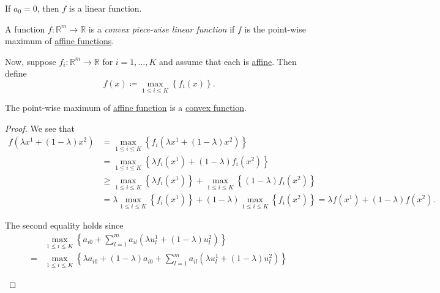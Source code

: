 \begin{remark}
	If \(a_0 = 0\), then \(f\) is a linear function.
\end{remark}

\begin{definition}\label{def:convex-piece-wise-linear-function}
	A function \(f\colon \mathbb{R}^{m}\to \mathbb{R}\) is a \emph{convex piece-wise linear function} if
	\(f\) is the point-wise maximum of \hyperref[def:affine-function]{affine functions}.
	\begin{center}
	\end{center}
\end{definition}

Now, suppose \(f_{i}\colon \mathbb{R}^m \to \mathbb{R}\) for \(i = 1, \ldots , K\) and assume that each is \hyperref[def:affine-function]{affine}.
Then define
\[
	f(x)\coloneqq \max_{1\leq i\leq K} \left\{ f_i(x) \right\}.
\]

\begin{theorem}
	The point-wise maximum of \hyperref[def:affine-function]{affine function} is a \hyperref[def:convex-function]{convex function}.
\end{theorem}
\begin{proof}
	We see that
	\[
		\begin{split}
			f(\lambda x^1 + (1 - \lambda)x^2) &=\max_{1\leq i\leq K}\left\{ f_i(\lambda x^1 + (1 - \lambda)x^2) \right\}\\
			&=\max_{1\leq i\leq K}\left\{ \lambda f_{i}(x^1) + (1 - \lambda)f_{i}(x^2) \right\}\\
			&\geq \max_{1\leq i\leq K}\left\{ \lambda f_{i}(x^1)\right\} + \max_{1\leq i\leq K}\left\{(1 - \lambda)f_{i}(x^2) \right\}\\
			&=\lambda\max_{1\leq i\leq K}\left\{f_{i}(x^1)\right\} + (1 - \lambda)\max_{1\leq i\leq K}\left\{f_{i}(x^2) \right\}
			= \lambda f(x^1)+(1 - \lambda)f(x^2).
		\end{split}
	\]
	\begin{remark}
		The second equality holds since
		\[
			\begin{split}
				&\max_{1\leq i\leq K}\left\{ a_{i0}+\sum\limits_{l=1}^{m} a_{il}(\lambda u^1_l + (1 - \lambda)u^2_l) \right\}\\
				= &\max_{1\leq i\leq K}\left\{ \lambda a_{i0}+(1 - \lambda)a_{i0} + \sum\limits_{l=1}^{m} a_{il}(\lambda u^1_l + (1 - \lambda)u^2_l) \right\}
			\end{split}
		\]
	\end{remark}
\end{proof}